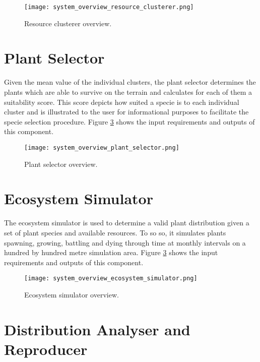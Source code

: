 \begin{figure}
\center
	\texttt{[image: system\_overview\_resource\_clusterer.png]}
	\caption{ Resource clusterer overview.}	
	\label{fig:system_overview_resoure_clusterer}
\end{figure}

\section{Plant Selector}

Given the mean value of the individual clusters, the plant selector determines the plants which are able to survive on the terrain and calculates for each of them a suitability score. This score depicts how suited a specie is to each individual cluster and is illustrated to the user for informational purposes to facilitate the specie selection procedure. Figure \ref{fig:system_overview_plant_selector} shows the input requirements and outputs of this component.

\begin{figure}
\center
	\texttt{[image: system\_overview\_plant\_selector.png]}
	\caption{ Plant selector overview.}	
	\label{fig:system_overview_plant_selector}
\end{figure}

\section{Ecosystem Simulator}

The ecosystem simulator is used to determine a valid plant distribution given a set of plant species and available resources. To so so, it simulates plants spawning, growing, battling and dying through time at monthly intervals on a hundred by hundred metre simulation area. Figure \ref{fig:system_overview_plant_selector} shows the input requirements and outputs of this component.

\begin{figure}
\center
	\texttt{[image: system\_overview\_ecosystem\_simulator.png]}
	\caption{ Ecosystem simulator overview.}	
	\label{fig:system_overview_plant_selector}
\end{figure}

\section{Distribution Analyser and Reproducer}

